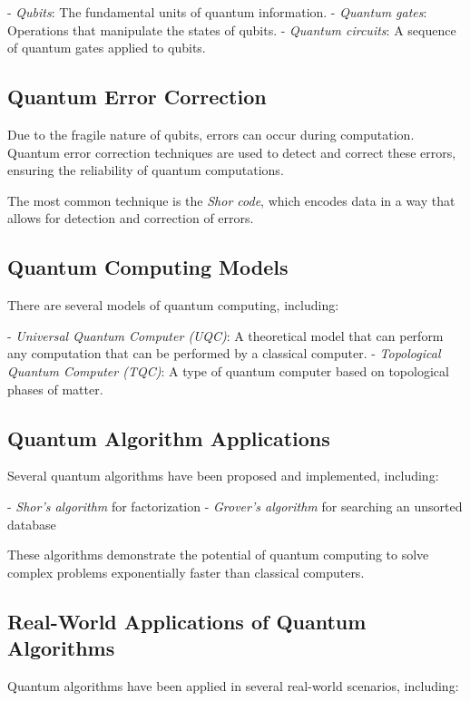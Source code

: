- \textit{Qubits}: The fundamental units of quantum information.
- \textit{Quantum gates}: Operations that manipulate the states of qubits.
- \textit{Quantum circuits}: A sequence of quantum gates applied to qubits.

\subsection{Quantum Error Correction}

Due to the fragile nature of qubits, errors can occur during computation. Quantum error correction techniques are used to detect and correct these errors, ensuring the reliability of quantum computations.

The most common technique is the \textit{Shor code}, which encodes data in a way that allows for detection and correction of errors.

\subsection{Quantum Computing Models}

There are several models of quantum computing, including:

- \textit{Universal Quantum Computer (UQC)}: A theoretical model that can perform any computation that can be performed by a classical computer.
- \textit{Topological Quantum Computer (TQC)}: A type of quantum computer based on topological phases of matter.

\subsection{Quantum Algorithm Applications}

Several quantum algorithms have been proposed and implemented, including:

- \textit{Shor's algorithm} for factorization
- \textit{Grover's algorithm} for searching an unsorted database

These algorithms demonstrate the potential of quantum computing to solve complex problems exponentially faster than classical computers.

\subsection{Real-World Applications of Quantum Algorithms}

Quantum algorithms have been applied in several real-world scenarios, including:

